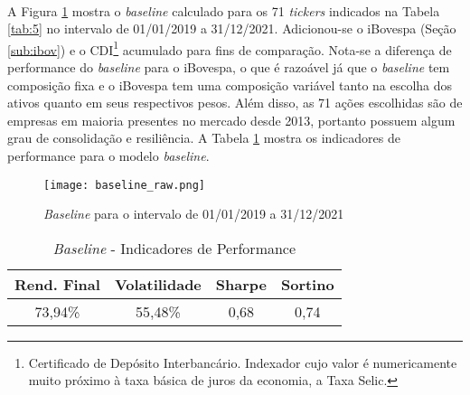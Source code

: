 \paragraph{} A Figura \ref{fig:170} mostra o \textit{baseline} calculado para os 71 \textit{tickers} indicados na Tabela \ref{tab:5} no intervalo de 01/01/2019 a 31/12/2021. Adicionou-se o iBovespa (Seção \ref{sub:ibov}) e o CDI\footnote{Certificado de Depósito Interbancário. Indexador cujo valor é numericamente muito próximo à taxa básica de juros da economia, a Taxa Selic.} acumulado para fins de comparação. Nota-se a diferença de performance do \textit{baseline} para o iBovespa, o que é razoável já que o \textit{baseline} tem composição fixa e o iBovespa tem uma composição variável tanto na escolha dos ativos quanto em seus respectivos pesos. Além disso, as 71 ações escolhidas são de empresas em maioria presentes no mercado desde 2013, portanto possuem algum grau de consolidação e resiliência. A Tabela \ref{tab:12} mostra os indicadores de performance para o modelo \textit{baseline}.

\begin{figure}[!htb]
    \texttt{[image: baseline\_raw.png]}
    \centering
    \caption{\textit{Baseline} para o intervalo de 01/01/2019 a 31/12/2021}
    \label{fig:170}
\end{figure}

\begin{table}[!htb]
    \begin{center}
        \begin{tabular}{ cccc }
            Rend. Final & Volatilidade & Sharpe & Sortino \\
            \hline
            73,94\% & 55,48\% & 0,68 & 0,74 \\
        \end{tabular}
        \caption{\textit{Baseline} - Indicadores de Performance}
        \label{tab:12}
    \end{center}
\end{table}

